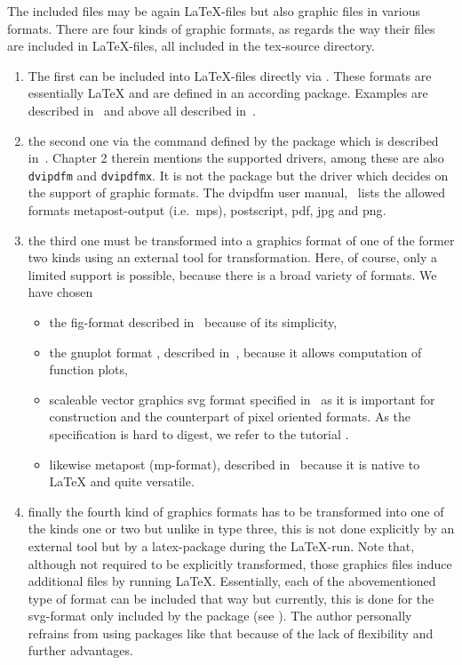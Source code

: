 The included files may be again \LaTeX-files but also graphic files 
in various formats. 
There are four kinds of graphic formats, 
as regards the way their files are included in \LaTeX-files, 
all included in the tex-source directory. 
%
\begin{enumerate}
\item
The first can be included into \LaTeX-files directly via . 
These formats are essentially \LaTeX{}
and are defined in an according package. 
Examples are  described in~\cite{EEpic}
and above all  described in~\cite{TikzPGF}. 
\item
the second one via the command  
defined by the package  
which is described in~\cite{GraX}. 
Chapter 2 therein mentions the supported drivers, 
among these are also \texttt{dvipdfm} and \texttt{dvipdfmx}. 
It is not the package but the driver 
which decides on the support of graphic formats. 
The dvipdfm user manual,~\cite{DviPdfMx} lists the allowed formats 
metapost-output (i.e.~\gls{mps}), postscript, 
\gls{pdf}, \gls{jpg} and \gls{png}. 
\item\label{it:transExp}
the third one must be transformed into a graphics format 
of one of the former two kinds using an external tool for transformation. 
Here, of course, only a limited support is possible, 
because there is a broad variety of formats. 
We have chosen
%
\begin{itemize}
\item
the \gls{fig}-format described in~\cite{XFigF}
because of its simplicity, 
\item
the gnuplot format , described in~\cite{GnuPlot}, 
because it allows computation of function plots, 
\item
  scaleable vector graphics svg format specified in~\cite{Svg11} 
  as it is important for construction and the counterpart of pixel oriented
  formats.
  As the specification is hard to digest,
  we refer to the tutorial \cite{SvgTut}. 
\item
  likewise metapost (\gls{mp}-format),
  described in~\cite{MPost} because it is native to \LaTeX
  and quite versatile. 
\end{itemize}
\item\label{it:transImp}
finally the fourth kind of graphics formats 
has to be transformed into one of the kinds one or two 
but unlike in type three, this is not done explicitly 
by an external tool but by a latex-package during the \LaTeX-run. 
Note that, although not required to be explicitly transformed, 
those graphics files induce additional files 
by running \LaTeX.
Essentially, each of the abovementioned type of format
can be included that way but currently,
this is done for the \gls{svg}-format only
included by the package  (see \cite{SvgP}).
The author personally refrains from using packages like that
because of the lack of flexibility and further advantages. 
\end{enumerate}

